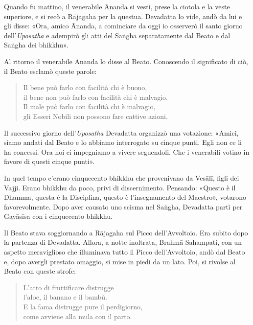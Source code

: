 

Quando fu mattino, il venerabile Ānanda si vestì, prese la ciotola e la
veste superiore, e si recò a Rājagaha per la questua. Devadatta lo vide,
andò da lui e gli disse: «Ora, amico Ānanda, a cominciare da oggi io
osserverò il santo giorno dell’\emph{Uposatha} e adempirò gli atti del Saṅgha
separatamente dal Beato e dal Saṅgha dei bhikkhu».


Al ritorno il venerabile Ānanda lo disse al Beato. Conoscendo il
significato di ciò, il Beato esclamò queste parole:


\begin{quote}
Il bene può farlo con facilità chi è buono, \\
il bene non può farlo con facilità chi è malvagio. \\
Il male può farlo con facilità chi è malvagio, \\
gli Esseri Nobili non possono fare cattive azioni.
\end{quote}

Il successivo giorno dell’\emph{Uposatha} Devadatta organizzò una votazione:
«Amici, siamo andati dal Beato e lo abbiamo interrogato su cinque punti.
Egli non ce li ha concessi. Ora noi ci impegniamo a vivere seguendoli.
Che i venerabili votino in favore di questi cinque punti».


In quel tempo c’erano cinquecento bhikkhu che provenivano da Vesālī,
figli dei Vajji. Erano bhikkhu da poco, privi di discernimento.
Pensando: «Questo è il Dhamma, questa è la Disciplina, questo è
l’insegnamento del Maestro», votarono favorevolmente. Dopo aver causato
uno scisma nel Saṅgha, Devadatta partì per Gayāsīsa con i cinquecento
bhikkhu.




 Il Beato stava soggiornando a Rājagaha sul Picco
dell’Avvoltoio. Era subito dopo la partenza di Devadatta. Allora, a
notte inoltrata, Brahmā Sahampati, con un aspetto meraviglioso che
illuminava tutto il Picco dell’Avvoltoio, andò dal Beato e, dopo avergli
prestato omaggio, si mise in piedi da un lato. Poi, si rivolse al Beato
con queste strofe:


\begin{quote}
L’atto di fruttificare distrugge \\
l’aloe, il banano e il bambù. \\
E la fama distrugge pure il perdigiorno, \\
come avviene alla mula con il parto.
\end{quote}


